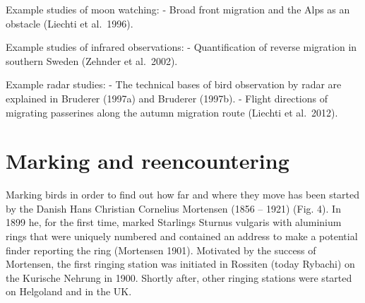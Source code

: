 \documentclass[
]{book}
\begin{document}
Example studies of moon watching:
- Broad front migration and the Alps as an obstacle (Liechti et al.~1996).

Example studies of infrared observations:
- Quantification of reverse migration in southern Sweden (Zehnder et al.~2002).

Example radar studies:
- The technical bases of bird observation by radar are explained in Bruderer (1997a) and Bruderer (1997b).
- Flight directions of migrating passerines along the autumn migration route (Liechti et al.~2012).

\hypertarget{marking-and-reencountering}{%
\section{Marking and reencountering}\label{marking-and-reencountering}}

Marking birds in order to find out how far and where they move has been started by the Danish Hans Christian Cornelius Mortensen (1856 -- 1921) (Fig. 4). In 1899 he, for the first time, marked Starlings Sturnus vulgaris with aluminium rings that were uniquely numbered and contained an address to make a potential finder reporting the ring (Mortensen 1901). Motivated by the success of Mortensen, the first ringing station was initiated in Rossiten (today Rybachi) on the Kurische Nehrung in 1900. Shortly after, other ringing stations were started on Helgoland and in the UK.
\end{document}
